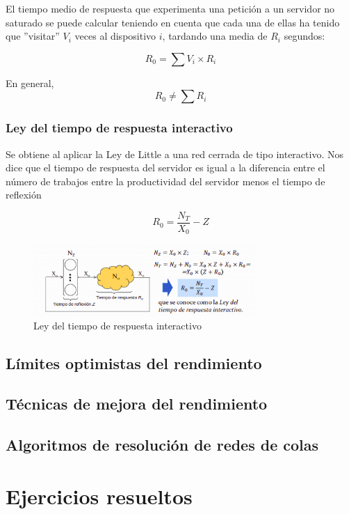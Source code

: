 \documentclass[12pt,spanish]{article}
\begin{document}
El tiempo medio de respuesta que experimenta una petición a un servidor no saturado se puede calcular teniendo en cuenta que cada una de ellas ha tenido que ''visitar'' $V_i$ veces al dispositivo $i$, tardando una media de $R_i$ segundos:

\begin{equation*}
	R_0=\sum{V_i \times R_i}
\end{equation*}

En general,
\begin{equation*}
	R_0 \not = \sum{R_i}
\end{equation*}

\subsubsection{Ley del tiempo de respuesta interactivo}

Se obtiene al aplicar la Ley de Little a una red cerrada de tipo interactivo. Nos dice que el tiempo de respuesta del servidor es igual a la diferencia entre el número de trabajos entre la productividad del servidor menos el tiempo de reflexión

\begin{equation*}
	R_0=\frac{N_T}{X_0} - Z
\end{equation*}

\begin{figure}[H]
	\centering
	\includegraphics[width=0.75\textwidth]{leyrespint.png}
	\caption{Ley del tiempo de respuesta interactivo}
\end{figure}

\subsection{Límites optimistas del rendimiento}

\subsection{Técnicas de mejora del rendimiento}

\subsection{Algoritmos de resolución de redes de colas}



\section{Ejercicios resueltos}

\end{document}
